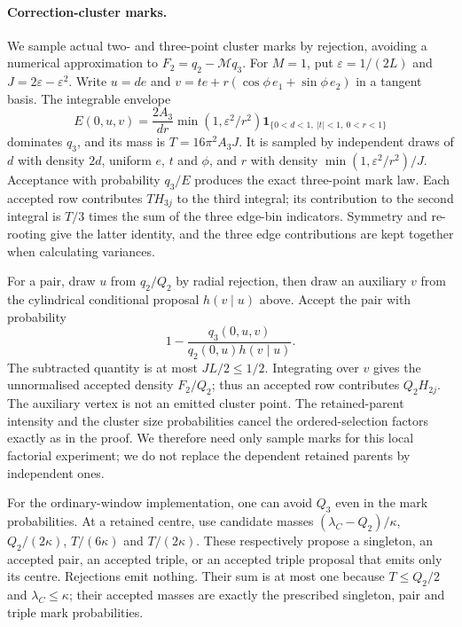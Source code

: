 \paragraph{Correction-cluster marks.}
We sample actual two- and three-point cluster marks by rejection, avoiding
a numerical approximation to $F_2=q_2-\mathcal Mq_3$. For $M=1$, put
$\varepsilon=1/(2L)$ and $J=2\varepsilon-\varepsilon^2$. Write
$u=de$ and $v=te+r(\cos\phi\,e_1+\sin\phi\,e_2)$ in a tangent basis.
The integrable envelope
\[
 E(0,u,v)=\frac{2A_3}{dr}\min(1,\varepsilon^2/r^2)
      \mathbf1_{\{0<d<1,\ |t|<1,\ 0<r<1\}}
\]
dominates $q_3$, and its mass is $T=16\pi^2A_3J$.
It is sampled by independent draws of $d$ with density $2d$, uniform $e$,
$t$ and $\phi$, and $r$ with density
$\min(1,\varepsilon^2/r^2)/J$. Acceptance with probability $q_3/E$
produces the exact three-point mark law. Each accepted row contributes
$TH_{3j}$ to the third integral; its contribution to the second integral
is $T/3$ times the sum of the three edge-bin indicators. Symmetry and
re-rooting give the latter identity, and the three edge contributions are
kept together when calculating variances.

For a pair, draw $u$ from $q_2/Q_2$ by radial rejection, then draw an auxiliary
$v$ from the cylindrical conditional proposal $h(v\mid u)$ above. Accept
the pair with probability
\[
 1-\frac{q_3(0,u,v)}{q_2(0,u)h(v\mid u)}.
\]
The subtracted quantity is at most $JL/2\leq1/2$. Integrating over $v$ gives
the unnormalised accepted density $F_2/Q_2$; thus an accepted row contributes
$Q_2H_{2j}$. The auxiliary vertex is not an emitted cluster point.
The retained-parent intensity and the cluster size probabilities cancel
the ordered-selection factors exactly as in the proof. We therefore need
only sample marks for this local factorial experiment; we do not replace
the dependent retained parents by independent ones.

For the ordinary-window implementation, one can avoid $Q_3$ even in the
mark probabilities. At a retained centre, use candidate masses
$(\lambda_C-Q_2)/\kappa$, $Q_2/(2\kappa)$, $T/(6\kappa)$ and
$T/(2\kappa)$. These respectively propose a singleton, an accepted pair,
an accepted triple, or an accepted triple proposal that emits only its
centre. Rejections emit nothing. Their sum is at most one because
$T\leq Q_2/2$ and $\lambda_C\leq\kappa$; their accepted masses are exactly
the prescribed singleton, pair and triple mark probabilities.

